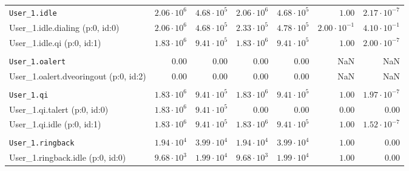 \begin{table}[htbp]
{\begin{tabular}{lrrrrrr}
\\[-8pt]\texttt{User\_1.idle}                        & $2.06 \cdot 10^{6}$ & $4.68 \cdot 10^{5}$ & $2.06 \cdot 10^{6}$ & $4.68 \cdot 10^{5}$ &               $1.00$ & $2.17 \cdot 10^{-7}$ \\
\hspace{3mm}User\_1.idle.dialing (p:0, id:0)         & $2.06 \cdot 10^{6}$ & $4.68 \cdot 10^{5}$ & $2.33 \cdot 10^{5}$ & $4.78 \cdot 10^{5}$ & $2.00 \cdot 10^{-1}$ & $4.10 \cdot 10^{-1}$ \\
\hspace{3mm}User\_1.idle.qi (p:0, id:1)              & $1.83 \cdot 10^{6}$ & $9.41 \cdot 10^{5}$ & $1.83 \cdot 10^{6}$ & $9.41 \cdot 10^{5}$ &               $1.00$ & $2.00 \cdot 10^{-7}$ \\
\\[-8pt]\texttt{User\_1.oalert}                      &              $0.00$ &              $0.00$ &              $0.00$ &              $0.00$ &                  NaN &                  NaN \\
\hspace{3mm}User\_1.oalert.dveoringout (p:0, id:2)   &              $0.00$ &              $0.00$ &              $0.00$ &              $0.00$ &                  NaN &                  NaN \\
\\[-8pt]\texttt{User\_1.qi}                          & $1.83 \cdot 10^{6}$ & $9.41 \cdot 10^{5}$ & $1.83 \cdot 10^{6}$ & $9.41 \cdot 10^{5}$ &               $1.00$ & $1.97 \cdot 10^{-7}$ \\
\hspace{3mm}User\_1.qi.talert (p:0, id:0)            & $1.83 \cdot 10^{6}$ & $9.41 \cdot 10^{5}$ &              $0.00$ &              $0.00$ &               $0.00$ &               $0.00$ \\
\hspace{3mm}User\_1.qi.idle (p:0, id:1)              & $1.83 \cdot 10^{6}$ & $9.41 \cdot 10^{5}$ & $1.83 \cdot 10^{6}$ & $9.41 \cdot 10^{5}$ &               $1.00$ & $1.52 \cdot 10^{-7}$ \\
\\[-8pt]\texttt{User\_1.ringback}                    & $1.94 \cdot 10^{4}$ & $3.99 \cdot 10^{4}$ & $1.94 \cdot 10^{4}$ & $3.99 \cdot 10^{4}$ &               $1.00$ &               $0.00$ \\
\hspace{3mm}User\_1.ringback.idle (p:0, id:0)        & $9.68 \cdot 10^{3}$ & $1.99 \cdot 10^{4}$ & $9.68 \cdot 10^{3}$ & $1.99 \cdot 10^{4}$ &               $1.00$ &               $0.00$ \\

\end{tabular}}
\end{table}

